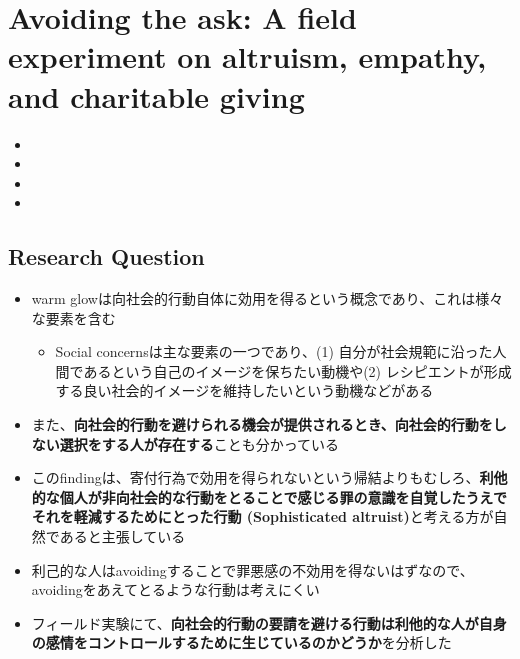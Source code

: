 \documentclass[../root]{subfiles}
\begin{document}
    \chapter{Avoiding the ask: A field experiment on altruism, empathy, and charitable giving}

    \begin{shortsummary}
        \begin{itemize}
            \item {}
            \item {}
            \item {}
            \item {}
        \end{itemize}
    \end{shortsummary}

    \section{Research Question}

    \begin{itemize}
        \item warm glowは向社会的行動自体に効用を得るという概念であり、これは様々な要素を含む
        \begin{itemize}
            \item Social concernsは主な要素の一つであり、(1) 自分が社会規範に沿った人間であるという自己のイメージを保ちたい動機や(2) レシピエントが形成する良い社会的イメージを維持したいという動機などがある
        \end{itemize}
        \item また、\textbf{向社会的行動を避けられる機会が提供されるとき、向社会的行動をしない選択をする人が存在する}ことも分かっている
        \item このfindingは、寄付行為で効用を得られないという帰結よりもむしろ、\textbf{利他的な個人が非向社会的な行動をとることで感じる罪の意識を自覚したうえでそれを軽減するためにとった行動 (Sophisticated altruist)}と考える方が自然であると主張している
        \item 利己的な人はavoidingすることで罪悪感の不効用を得ないはずなので、avoidingをあえてとるような行動は考えにくい
        \item フィールド実験にて、\textbf{向社会的行動の要請を避ける行動は利他的な人が自身の感情をコントロールするために生じているのかどうか}を分析した
    \end{itemize}
\end{document}
